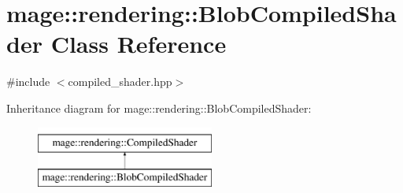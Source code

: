 \hypertarget{classmage_1_1rendering_1_1_blob_compiled_shader}{}\section{mage\+:\+:rendering\+:\+:Blob\+Compiled\+Shader Class Reference}
\label{classmage_1_1rendering_1_1_blob_compiled_shader}


{\ttfamily \#include $<$compiled\+\_\+shader.\+hpp$>$}

Inheritance diagram for mage\+:\+:rendering\+:\+:Blob\+Compiled\+Shader\+:\begin{figure}[H]
\begin{center}
\leavevmode
\includegraphics[height=2.000000cm]{classmage_1_1rendering_1_1_blob_compiled_shader}
\end{center}
\end{figure}
